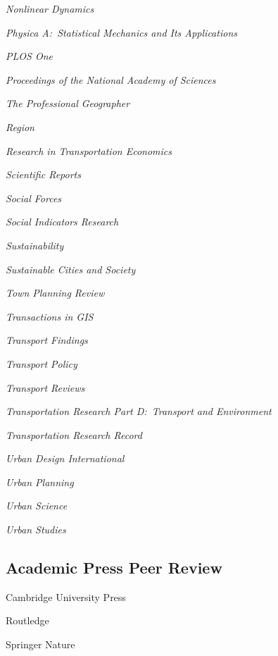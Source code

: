 \documentclass[12pt,letterpaper]{report}
\newcommand{\listitemspace}{0.25em}
\renewenvironment{itemize}
{\begin{list}{}{\setlength{\leftmargin}{0em}
                \setlength{\parskip}{0em}
                \setlength{\itemsep}{\listitemspace}
                \setlength{\parsep}{\listitemspace}}}
{\end{list}}
\begin{document}
\begin{itemize}
        \item \textit{Nonlinear Dynamics}
        \item \textit{Physica A:\ Statistical Mechanics and Its Applications}
        \item \textit{PLOS One}
        \item \textit{Proceedings of the National Academy of Sciences}
        \item \textit{The Professional Geographer}
        \item \textit{Region}
        \item \textit{Research in Transportation Economics}
        \item \textit{Scientific Reports}
        \item \textit{Social Forces}
        \item \textit{Social Indicators Research}
        \item \textit{Sustainability}
        \item \textit{Sustainable Cities and Society}
        \item \textit{Town Planning Review}
        \item \textit{Transactions in GIS}
        \item \textit{Transport Findings}
        \item \textit{Transport Policy}
        \item \textit{Transport Reviews}
        \item \textit{Transportation Research Part D:\ Transport and Environment}
        \item \textit{Transportation Research Record}
        \item \textit{Urban Design International}
        \item \textit{Urban Planning}
        \item \textit{Urban Science}
        \item \textit{Urban Studies}

    \end{itemize}

    \subsection*{Academic Press Peer Review}

    \begin{itemize}

        \item Cambridge University Press
        \item Routledge
        \item Springer Nature

    \end{itemize}
\end{document}
